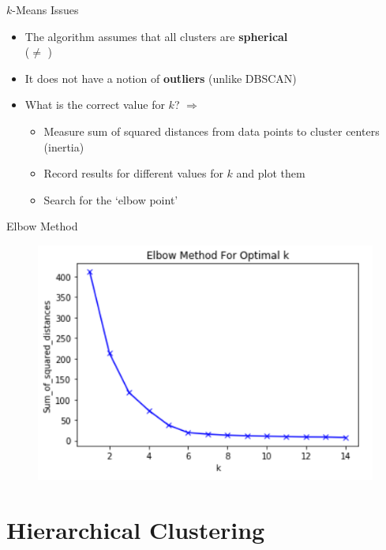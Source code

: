 \begin{frame}{$k$-Means Issues}{}
	\begin{itemize}
		\item The algorithm assumes that all clusters are \textbf{spherical} \\
			($\ne$ )
		\item It does not have a notion of \textbf{outliers} (unlike DBSCAN)
		\item What is the correct value for $k$? $\Rightarrow$ 
		\begin{itemize}
			\item Measure sum of squared distances from data points to cluster centers (inertia)
			\item Record results for different values for $k$ and plot them
			\item Search for the `elbow point'
		\end{itemize}
	\end{itemize}
\end{frame}


\begin{frame}{Elbow Method}{}
	\begin{figure}
		\centering
		\includegraphics[scale=0.6]{12_clustering/02_img/elbow}
	\end{figure}
\end{frame}


\section{Hierarchical Clustering}

